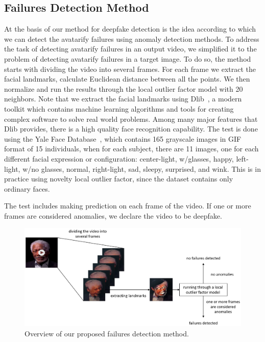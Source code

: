 \documentclass[english,12pt]{article}
\begin{document}
\subsection{Failures Detection Method}
At the basis of our method for deepfake detection is the idea according to which we can detect
the avatarify failures using anomaly detection methods. To address the task of detecting avatarify
failures in an output video, we simplified it to the problem of detecting avatarify failures in a
target image. To do so, the method starts with dividing the video into several frames.
For each frame we extract the facial landmarks, calculate Euclidean distance between all the points.
We then normalize and run the results through the local outlier factor model with 20 neighbors.
Note that we extract the facial landmarks using Dlib~\cite{Dlib, github}, a modern toolkit which contains machine learning
algorithms and tools for creating complex software to solve real world problems. Among many major features
that Dlib provides, there is a high quality face recognition capability.
The test is done using the Yale Face Database~\cite{Yale}, which contains 165 grayscale images in GIF format of
15 individuals, when for each subject, there are 11 images, one for each different facial expression or
configuration: center-light, w/glasses, happy, left-light, w/no glasses, normal, right-light, sad, sleepy,
surprised, and wink. This is in practice using novelty local outlier factor, since the dataset contains only ordinary faces.

The test includes making prediction on each frame of the video. If one or more frames are considered anomalies,
we declare the video to be deepfake.\\

\begin{figure}[htb]
  \begin{centering}
      \includegraphics[scale=0.34]{images/our.PNG}
  \par\end{centering}
  \caption{\label{fig:method}Overview of our proposed failures detection method.}
\end{figure}
\end{document}

